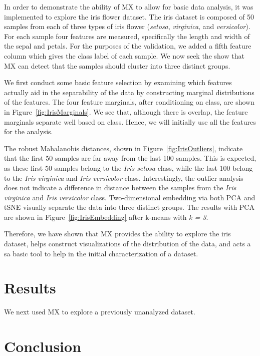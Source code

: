 \documentclass[12pt]{article}
\begin{document}
In order to demonstrate the ability of MX to allow for basic data analysis, it was implemented to explore the iris flower dataset. The iris dataset is composed of 50 samples from each of three types of iris flower (\textit{setosa}, \textit{virginica}, and \textit{versicolor}). For each sample four features are measured, specifically the length and width of the sepal and petals. For the purposes of the validation, we added a fifth feature column which gives the class label of each sample. We now seek the show that MX can detect that the samples should cluster into three distinct groups.

We first conduct some basic feature selection by examining which features actually aid in the separability of the data by constructing marginal distributions of the features. The four feature marginals, after conditioning on class, are shown in  Figure~\ref{fig:IrisMarginals}. We see that, although there is overlap, the feature marginals separate well based on class.  Hence, we will initially use all the features for the analysis.

The robust Mahalanobis distances, shown in  Figure~\ref{fig:IrisOutliers}, indicate that the first 50 samples are far away from the last 100 samples. This is expected, as these first 50 samples belong to the \textit{Iris setosa} class, while the last 100 belong to the \textit{Iris virginica} and \textit{Iris versicolor} class. Interestingly, the outlier analysis does not indicate a difference in distance between the samples from the \textit{Iris virginica} and \textit{Iris versicolor} class. Two-dimensional embedding via both PCA and tSNE visually separate the data into three distinct groups. The results with PCA are shown in Figure~\ref{fig:IrisEmbedding} after k-means with \textit{k = 3}.

Therefore, we have shown that MX provides the ability to explore the iris dataset, helps construct visualizations of the distribution of the data, and acts a sa basic tool to help in the initial characterization of a dataset.
 
\section{Results}
\label{sec:res}
We next used MX to explore a previously unanalyzed dataset.

\section{Conclusion}
\label{sec:conc}
\end{document}
